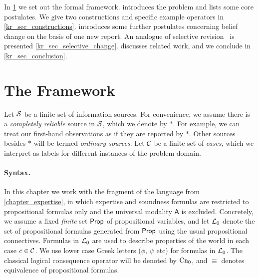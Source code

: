\begin{chapteroutline}
    In \cref{kr_sec_framework} we set out the formal framework.
     introduces the problem and lists some core
    postulates. We give two constructions and specific example operators in
    \cref{kr_sec_constructions}.  introduces
    some further postulates concerning belief change on the basis of one new
    report. An analogue of selective revision~\cite{ferme1999selective} is
    presented \cref{kr_sec_selective_change}. 
    discusses related work, and we conclude in \cref{kr_sec_conclusion}.
\end{chapteroutline}

\section{The Framework}
\label{kr_sec_framework}

Let $\mathcal{S}$ be a finite set of information sources. For convenience, we assume
there is a \emph{completely reliable} source in $\mathcal{S}$, which we denote by
$\ast$. For example, we can treat our first-hand observations as if they are
reported by $\ast$. Other sources besides $\ast$ will be termed \emph{ordinary
sources}. Let $\mathcal{C}$ be a finite set of \emph{cases}, which we interpret as
labels for different instances of the problem domain.

\paragraph{Syntax.}

In this chapter we work with the fragment of the language from
\cref{chapter_expertise}, in which expertise and soundness formulas are
restricted to propositional formulas only\footnotemark{} and the universal
modality $\mathsf{A}$ is excluded. Concretely, we assume
a fixed \emph{finite} set $\mathsf{Prop}$ of propositional variables, and let
$\mathcal{L}{}_0$ denote the set of propositional formulas generated from $\mathsf{Prop}$
using the usual propositional connectives. Formulas in $\mathcal{L}{}_0$ are used to
describe properties of the world in each case $c \in \mathcal{C}$. We use lower case
Greek letters ($\phi$, $\psi$ etc) for formulas in $\mathcal{L}{}_0$. The classical
logical consequence operator will be denoted by $\operatorname{Cn}_0$, and $\equiv$ denotes
equivalence of propositional formulas.


